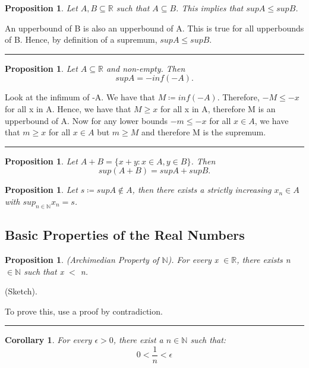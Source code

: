 \documentclass[twoside]{article}
\newtheorem{proposition}[theorem]{Proposition}
\newtheorem{corollary}[theorem]{Corollary}
\newenvironment{proof}{{\bf Proof:}}{\hfill\rule{2mm}{2mm}}
\begin{document}
\begin{proposition}
Let $A, B \subseteq \mathbb{R}$ such that $A \subseteq B$. This implies that $sup A \leq sup B$.
\end{proposition}
\begin{proof}
An upperbound of B is also an upperbound of A. This is true for all upperbounds of B. Hence, by definition of a supremum, $sup A \leq sup B$.
\end{proof}

\begin{proposition}
Let $A \subseteq \mathbb{R}$ and non-empty. Then
$$
sup A = -inf(-A).
$$
\end{proposition}
\begin{proof}
Look at the infimum of -A. We have that $M \coloneqq inf(-A)$. Therefore, $-M \leq -x$ for all x in A. Hence, we have that $M \geq x$ for all x in A, therefore M is an upperbound of A. Now for any lower bounds $-m \leq -x$ for all $x \in A$, we have that $m \geq x$ for all $x \in A$ but $m \geq M$ and therefore M is the supremum.
\end{proof}

\begin{proposition}
Let $A + B = \{x+y: x \in A, y \in B\}$. Then
$$
sup(A + B) = sup A + sup B.
$$
\end{proposition}

\begin{proposition}
Let $s \coloneqq sup A \not \in A$, then there exists a strictly increasing $x_n \in A$ with $sup_{n \in \mathbb{N}}x_n = s$.
\end{proposition}

\subsection{Basic Properties of the Real Numbers}

\begin{proposition}
(Archimedian Property of $\mathbb{N}$). For every x $\in \mathbb{R}$, there exists n $\in \mathbb{N}$ such that x $<$ n.
\end{proposition}

\begin{proof} (Sketch).

To prove this, use a proof by contradiction.
\end{proof}

\begin{corollary}
For every $\epsilon > 0$, there exist a $n \in \mathbb{N}$ such that:
$$
0 < \frac{1}{n} < \epsilon
$$
\end{corollary}
\end{document}
